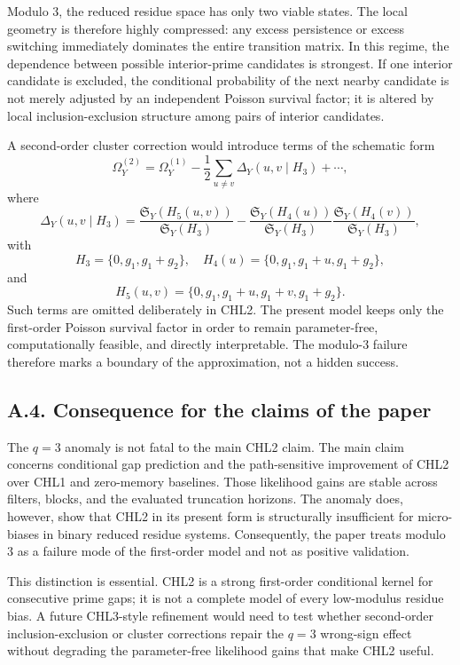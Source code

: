 \documentclass[10pt]{article}
\begin{document}
Modulo $3$, the reduced residue space has only two viable states.  The local geometry is therefore highly compressed: any excess persistence or excess switching immediately dominates the entire transition matrix.  In this regime, the dependence between possible interior-prime candidates is strongest.  If one interior candidate is excluded, the conditional probability of the next nearby candidate is not merely adjusted by an independent Poisson survival factor; it is altered by local inclusion-exclusion structure among pairs of interior candidates.

A second-order cluster correction would introduce terms of the schematic form
\[
\Omega_Y^{(2)}=\Omega_Y^{(1)}-\frac12\sum_{u\ne v}\Delta_Y(u,v\mid H_3)+\cdots,
\]
where
\[
\Delta_Y(u,v\mid H_3)=\frac{\mathfrak S_Y(H_5(u,v))}{\mathfrak S_Y(H_3)}-\frac{\mathfrak S_Y(H_4(u))}{\mathfrak S_Y(H_3)}\frac{\mathfrak S_Y(H_4(v))}{\mathfrak S_Y(H_3)},
\]
with
\[
H_3=\{0,g_1,g_1+g_2\},\quad
H_4(u)=\{0,g_1,g_1+u,g_1+g_2\},
\]
and
\[
H_5(u,v)=\{0,g_1,g_1+u,g_1+v,g_1+g_2\}.
\]
Such terms are omitted deliberately in CHL2.  The present model keeps only the first-order Poisson survival factor in order to remain parameter-free, computationally feasible, and directly interpretable.  The modulo-$3$ failure therefore marks a boundary of the approximation, not a hidden success.

\subsection*{A.4. Consequence for the claims of the paper}

The $q=3$ anomaly is not fatal to the main CHL2 claim.  The main claim concerns conditional gap prediction and the path-sensitive improvement of CHL2 over CHL1 and zero-memory baselines.  Those likelihood gains are stable across filters, blocks, and the evaluated truncation horizons.  The anomaly does, however, show that CHL2 in its present form is structurally insufficient for micro-biases in binary reduced residue systems.  Consequently, the paper treats modulo $3$ as a failure mode of the first-order model and not as positive validation.

This distinction is essential.  CHL2 is a strong first-order conditional kernel for consecutive prime gaps; it is not a complete model of every low-modulus residue bias.  A future CHL3-style refinement would need to test whether second-order inclusion-exclusion or cluster corrections repair the $q=3$ wrong-sign effect without degrading the parameter-free likelihood gains that make CHL2 useful.
\end{document}
